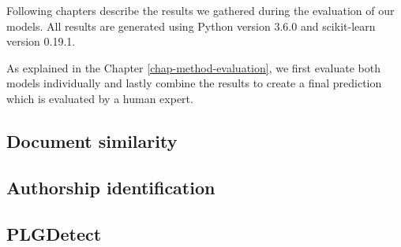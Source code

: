 
Following chapters describe the results we gathered during the evaluation of our models. All results are generated using Python version 3.6.0 and scikit-learn version 0.19.1. 

As explained in the Chapter \ref{chap-method-evaluation}, we first evaluate both models individually and lastly combine the results to create a final prediction which is evaluated by a human expert. 




\subsection{Document similarity}


\clearpage

\subsection{Authorship identification}


\subsection{PLGDetect}



\newpage